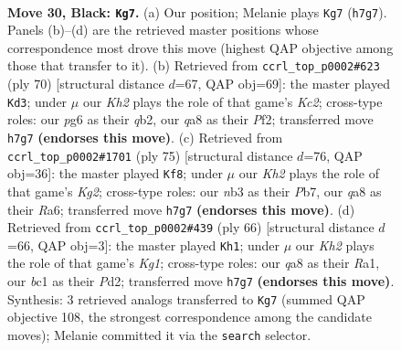 \documentclass[11pt]{article}
\begin{document}
\clearpage

\begin{figure}[p]\centering
\begin{subfigure}{0.46\textwidth}\centering
\resizebox{\linewidth}{!}{%
\newchessgame
\chessboard[
  setfen={Q7/p3r2k/p3p1P1/8/7q/1N6/1P3RB1/2B3K1 b - - 0 30},
  showmover=false,
  pgfstyle=straightmove, color=movearrow, markmove={h7-g7}
]}
\caption{}
\end{subfigure}\hfill
\begin{subfigure}{0.46\textwidth}\centering
\resizebox{\linewidth}{!}{%
\newchessgame
\chessboard[
  setfen={r7/2Q3bk/7p/p4N2/8/8/1qKR1PPP/8 w - - 0 36},
  showmover=false,
  pgfstyle=straightmove, color=movearrow, markmove={c2-d3}
]}
\caption{}
\end{subfigure}
\\[4pt]
\begin{subfigure}{0.46\textwidth}\centering
\resizebox{\linewidth}{!}{%
\newchessgame
\chessboard[
  setfen={6r1/1p3pk1/r2P4/6Q1/4P3/3P4/pq4BP/R6K b - - 1 38},
  showmover=false,
  pgfstyle=straightmove, color=movearrow, markmove={g7-f8}
]}
\caption{}
\end{subfigure}\hfill
\begin{subfigure}{0.46\textwidth}\centering
\resizebox{\linewidth}{!}{%
\newchessgame
\chessboard[
  setfen={5rk1/3q4/3Ppb2/1p1n3Q/3p4/3B4/3P3P/R5K1 w - - 0 34},
  showmover=false,
  pgfstyle=straightmove, color=movearrow, markmove={g1-h1}
]}
\caption{}
\end{subfigure}
\caption{\textbf{Move 30, Black: \texttt{Kg7}.} (a) Our position; Melanie plays \texttt{Kg7} (\texttt{h7g7}). Panels (b)--(d) are the retrieved master positions whose correspondence most drove this move (highest QAP objective among those that transfer to it). (b) Retrieved from \texttt{ccrl\_top\_p0002\#623} (ply 70) [structural distance $d$=67, QAP obj=69]: the master played \texttt{Kd3}; under $\mu$ our \emph{Kh2} plays the role of that game's \emph{Kc2}; cross-type roles: our \emph{p}g6 as their \emph{q}b2, our \emph{q}a8 as their \emph{P}f2; transferred move \texttt{h7g7} \textbf{(endorses this move)}. (c) Retrieved from \texttt{ccrl\_top\_p0002\#1701} (ply 75) [structural distance $d$=76, QAP obj=36]: the master played \texttt{Kf8}; under $\mu$ our \emph{Kh2} plays the role of that game's \emph{Kg2}; cross-type roles: our \emph{n}b3 as their \emph{P}b7, our \emph{q}a8 as their \emph{R}a6; transferred move \texttt{h7g7} \textbf{(endorses this move)}. (d) Retrieved from \texttt{ccrl\_top\_p0002\#439} (ply 66) [structural distance $d$=66, QAP obj=3]: the master played \texttt{Kh1}; under $\mu$ our \emph{Kh2} plays the role of that game's \emph{Kg1}; cross-type roles: our \emph{q}a8 as their \emph{R}a1, our \emph{b}c1 as their \emph{P}d2; transferred move \texttt{h7g7} \textbf{(endorses this move)}. Synthesis: 3 retrieved analogs transferred to \texttt{Kg7} (summed QAP objective 108, the strongest correspondence among the candidate moves); Melanie committed it via the \texttt{search} selector.}
\label{fig:thought-m59}
\end{figure}
\end{document}
